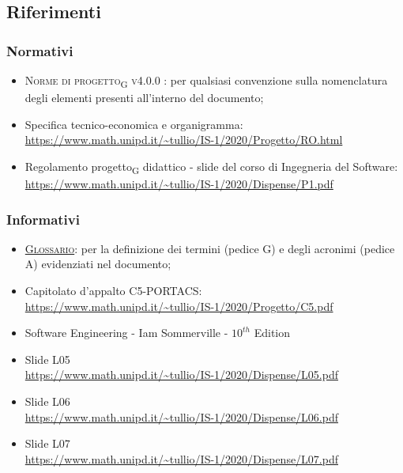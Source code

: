 \subsection{Riferimenti}



\subsubsection{Normativi}

\begin{itemize}
	\item \textsc{Norme di progetto\textsubscript{G} v4.0.0 }: per qualsiasi convenzione sulla nomenclatura degli elementi presenti all’interno del documento;
	\item Specifica tecnico-economica e organigramma: \\ {\url{https://www.math.unipd.it/~tullio/IS-1/2020/Progetto/RO.html}} %
	\item Regolamento progetto\textsubscript{G} didattico - slide del corso di Ingegneria del Software: \\ {\url{https://www.math.unipd.it/~tullio/IS-1/2020/Dispense/P1.pdf}}
\end{itemize}



\subsubsection{Informativi}
\begin{itemize}
	\item \textsc{\href{https://github.com/Three-Way-Milkshake/docs/wiki/Glossario}{Glossario}}: per la definizione dei termini (pedice G) e degli acronimi (pedice A) evidenziati nel documento;
	\item Capitolato d'appalto C5-PORTACS: \\
{\url{https://www.math.unipd.it/~tullio/IS-1/2020/Progetto/C5.pdf}}
	\item Software Engineering - Iam Sommerville - $10^{th}$ Edition
	\item Slide L05 \\
	{\url{https://www.math.unipd.it/~tullio/IS-1/2020/Dispense/L05.pdf}}%
	\item Slide L06 \\
	{\url{https://www.math.unipd.it/~tullio/IS-1/2020/Dispense/L06.pdf}}%
	\item Slide L07 \\
	{\url{https://www.math.unipd.it/~tullio/IS-1/2020/Dispense/L07.pdf}}%
\end{itemize}